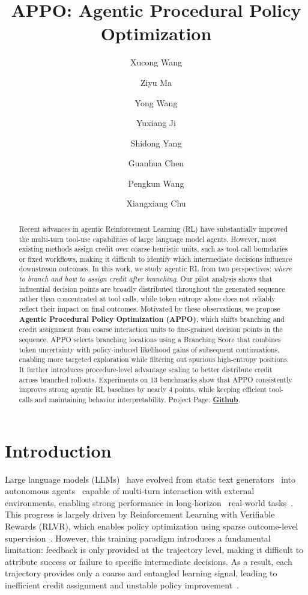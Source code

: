 \documentclass{llmxive}
\title{APPO: Agentic Procedural Policy Optimization}
\author{Xucong Wang \and Ziyu Ma \and Yong Wang \and Yuxiang Ji \and Shidong Yang \and Guanhua Chen \and Pengkun Wang \and Xiangxiang Chu}
\begin{document}
\maketitle
\begin{abstract}
Recent advances in agentic Reinforcement Learning (RL) have substantially improved the multi-turn tool-use capabilities of large language model agents. However, most existing methods assign credit over coarse heuristic units, such as tool-call boundaries or fixed workflows, making it difficult to identify which intermediate decisions influence downstream outcomes. In this work, we study agentic RL from two perspectives: \textit{where to branch and how to assign credit after branching}. Our pilot analysis shows that influential decision points are broadly distributed throughout the generated sequence rather than concentrated at tool calls, while token entropy alone does not reliably reflect their impact on final outcomes. Motivated by these observations, we propose \textbf{Agentic Procedural Policy Optimization (APPO)}, which shifts branching and credit assignment from coarse interaction units to fine-grained decision points in the sequence. APPO selects branching locations using a Branching Score that combines token uncertainty with policy-induced likelihood gains of subsequent continuations, enabling more targeted exploration while filtering out spurious high-entropy positions. It further introduces procedure-level advantage scaling to better distribute credit across branched rollouts. Experiments on 13 benchmarks show that APPO consistently improves strong agentic RL baselines by nearly 4 points, while keeping efficient tool-calls and maintaining behavior interpretability. Project Page: \href{https://github.com/AMAP-ML/APPO}{\textbf{Github}}.
\end{abstract}
\section{Introduction}
Large language models (LLMs)~\cite{wei2022chain,jaech2024openai,team2025kimi1,team2025kimi,team2025longcat,yang2025qwen3,li2025system} have evolved from static text generators~\cite{radford2019language} into autonomous agents~\cite{wang2025toward,zhang2025landscape,dong2025agentic,feng2025retool,ma2026skillclaw} capable of multi-turn interaction with external environments, enabling strong performance in long-horizon~\cite{lu2025pilotrl,gao2025beyond} real-world tasks~\cite{hafner2021benchmarking,cao2025skyrl,shridhar2020alfworld,yao2022webshop}. 
This progress is largely driven by Reinforcement Learning with Verifiable Rewards (RLVR), which enables policy optimization using sparse outcome-level supervision~\cite{guo2025deepseek,schulman2017proximal,lee2023rlaif,rafailov2023direct,shao2024deepseekmath,chu2026gpg}. 
However, this training paradigm introduces a fundamental limitation: feedback is only provided at the trajectory level, making it difficult to attribute success or failure to specific intermediate decisions. As a result, each trajectory provides only a coarse and entangled learning signal, leading to inefficient credit assignment and unstable policy improvement~\cite{qian2025smart,feng2025group,hou2025treerl,ji2025tree}.
\end{document}
